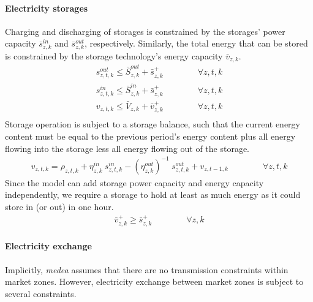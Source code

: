 \documentclass[11pt,a4paper]{article}
\begin{document}
\paragraph{Electricity storages}
Charging and discharging of storages is constrained by the storages' power capacity $\bar{s}^{in}_{z,k}$ and $\bar{s}^{out}_{z,k}$, respectively. Similarly, the total energy that can be stored is constrained by the storage technology's energy capacity $\bar{v}_{z,k}$.
\begin{align}
s^{out}_{z,t,k} \leq \bar{S}^{out}_{z,k} + \bar{s}^{+}_{z,k} \qquad \qquad \forall z,t,k \\
s^{in}_{z,t,k} \leq \bar{S}^{in}_{z,k} + \bar{s}^{+}_{z,k} \qquad \qquad \forall z,t,k \\
v_{z,t,k} \leq \bar{V}_{z,k} + \bar{v}^{+}_{z,k} \qquad \qquad \forall z,t,k \\
\end{align}
Storage operation is subject to a storage balance, such that the current energy content must be equal to the previous period's energy content plus all energy flowing into the storage less all energy flowing out of the storage.
\begin{align}
v_{z,t,k} = \rho_{z,t,k} + \eta^{in}_{z,k} \: s^{in}_{z,t,k} - (\eta^{out}_{z,k})^{-1} \: s^{out}_{z,t,k} + v_{z,t-1,k} \qquad \qquad \forall z,t,k
\end{align}
Since the model can add storage power capacity and energy capacity independently, we require a storage to hold at least as much energy as it could store in (or out) in one hour.
\begin{align}
\bar{v}^{+}_{z,k} \geq \bar{s}^{+}_{z,k} \qquad \qquad \forall z,k
\end{align}

\paragraph{Electricity exchange}
Implicitly, \emph{medea} assumes that there are no transmission constraints within market zones. 
However, electricity exchange between market zones is subject to several constraints.
\end{document}
